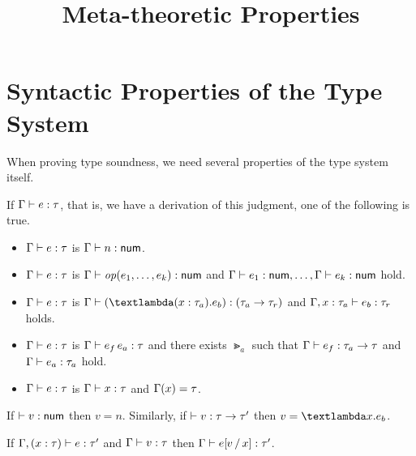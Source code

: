 \documentclass{article}
\title{Meta-theoretic Properties}
\author{}
\date{}
\begin{document}
\maketitle

\section{Syntactic Properties of the Type System}

When proving type soundness, we need several properties of the type system itself.

\begin{prop}
  If $\TTypes{\GG}{e}{\Gt}$, that is, we have a derivation of this judgment, one of the following is true.
  \begin{itemize}
    \item $\TTypes{\GG}{e}{\Gt}$ is $\TTypes{\GG}{n}{\TNum}$.
    \item $\TTypes{\GG}{e}{\Gt}$ is $\TTypes{\GG}{\TOp{e_1,\dots,e_k}}{\TNum}$ and $\TTypes{\GG}{e_1}{\TNum},\dots,\TTypes{\GG}{e_k}{\TNum}$ hold.
    \item $\TTypes{\GG}{e}{\Gt}$ is $\TTypes{\GG}{(\TFun{(\TAnn{x}{\Gt_a})}{e_b})}{(\TArrow{\Gt_a}{\Gt_r})}$ and $\TTypes{\GG,\TAnn{x}{\Gt_a}}{e_b}{\Gt_r}$ holds.
    \item $\TTypes{\GG}{e}{\Gt}$ is $\TTypes{\GG}{\TApp{e_f}{e_a}}{\Gt}$ and there exists $\Gt_a$ such that $\TTypes{\GG}{e_f}{\TArrow{\Gt_a}{\Gt}}$ and $\TTypes{\GG}{e_a}{\Gt_a}$ hold.
    \item $\TTypes{\GG}{e}{\Gt}$ is $\TTypes{\GG}{x}{\Gt}$ and $\GG(x)=\Gt$.
  \end{itemize}
\end{prop}

\begin{prop}
  If $\TTypes{}{v}{\TNum}$ then $v=n$. Similarly, if $\TTypes{}{v}{\TArrow{\Gt}{\Gt'}}$ then $v=\TFun{x}{e_b}$.
\end{prop}

\begin{prop} If $\TTypes{\GG,(\TAnn{x}{\Gt})}{e}{\Gt'}$
and $\TTypes{\GG}{v}{\Gt}$ then $\TTypes{\GG}{\subst{e}{x}{v}}{\Gt'}$.
\end{prop}
\end{document}
